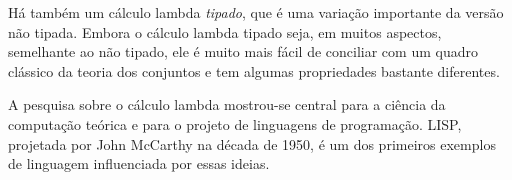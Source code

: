 \documentclass[../../../include/open-logic-section]{subfiles}
\begin{document}
\begin{digress}
Há também um cálculo lambda \emph{tipado}, que é uma variação importante da
versão não tipada. Embora o cálculo lambda tipado seja, em muitos aspectos,
semelhante ao não tipado, ele é muito mais fácil de conciliar com um quadro
clássico da teoria dos conjuntos e tem algumas propriedades bastante
diferentes.

A pesquisa sobre o cálculo lambda mostrou-se central para a ciência da
computação teórica e para o projeto de linguagens de programação. LISP,
projetada por John McCarthy na década de 1950, é um dos primeiros exemplos
de linguagem influenciada por essas ideias.
\end{digress}
\end{document}
